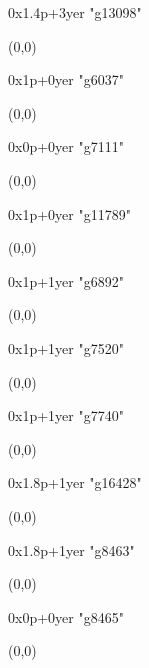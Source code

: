    0x1.4p+3yer "g13098"
  \begin{textblock}{1}(0,0)
  \end{textblock}

   0x1p+0yer "g6037"
  \begin{textblock}{1}(0,0)
  \end{textblock}

   0x0p+0yer "g7111"
  \begin{textblock}{1}(0,0)
  \end{textblock}

   0x1p+0yer "g11789"
  \begin{textblock}{1}(0,0)
  \end{textblock}

   0x1p+1yer "g6892"
  \begin{textblock}{1}(0,0)
  \end{textblock}

   0x1p+1yer "g7520"
  \begin{textblock}{1}(0,0)
  \end{textblock}

   0x1p+1yer "g7740"
  \begin{textblock}{1}(0,0)
  \end{textblock}

   0x1.8p+1yer "g16428"
  \begin{textblock}{1}(0,0)
  \end{textblock}

   0x1.8p+1yer "g8463"
  \begin{textblock}{1}(0,0)
  \end{textblock}

   0x0p+0yer "g8465"
  \begin{textblock}{1}(0,0)
  \end{textblock}


